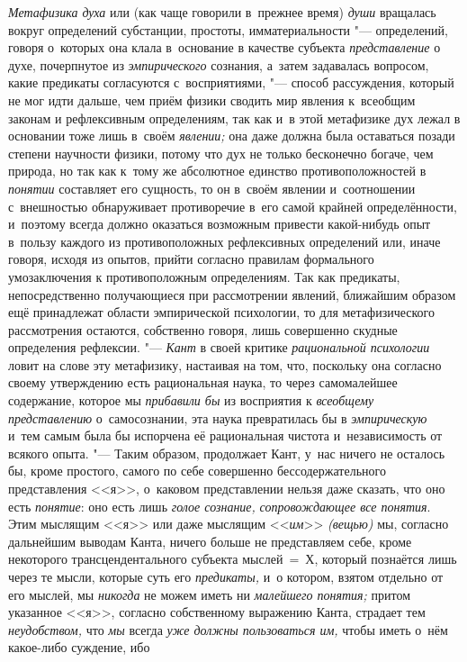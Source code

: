 {\em Метафизика духа} или (как чаще говорили в~прежнее время)
{\em души} вращалась
вокруг определений субстанции, простоты, имматериальности
"--- определений, говоря о~которых она клала в~основание в
качестве субъекта {\em представление}
о духе, почерпнутое из {\em эмпирического}
сознания, а~затем задавалась вопросом, какие предикаты
согласуются с~восприятиями, "--- способ рассуждения, который не
мог идти дальше, чем приём физики сводить мир явления к~всеобщим законам и
рефлексивным определениям, так как и~в этой метафизике дух лежал в
основании тоже лишь в~своём {\em явлении;} она даже
должна была оставаться позади степени научности физики,
потому что дух не только бесконечно богаче, чем природа, но
так как к~тому же абсолютное единство противоположностей в
{\em понятии} составляет
его сущность, то он в~своём явлении и~соотношении с~внешностью обнаруживает
противоречие в~его самой крайней определённости, и~поэтому всегда должно
оказаться возможным привести какой-нибудь опыт в~пользу каждого из
противоположных рефлексивных определений или, иначе говоря, исходя из
опытов, прийти согласно правилам формального умозаключения к
противоположным определениям. Так как предикаты, непосредственно
получающиеся при рассмотрении явлений, ближайшим образом ещё принадлежат
области эмпирической психологии, то для метафизического рассмотрения
остаются, собственно говоря, лишь совершенно скудные определения
рефлексии. "--- {\em Кант} в
своей критике {\em рациональной
психологии} ловит на слове эту метафизику, настаивая на том,
что, поскольку она согласно своему утверждению есть рациональная наука, то
через самомалейшее содержание, которое мы
{\em прибавили бы} из
восприятия к {\em всеобщему
представлению} о~самосознании, эта наука превратилась бы в
{\em эмпирическую} и~тем
самым была бы испорчена её рациональная чистота и~независимость от всякого
опыта. "--- Таким образом, продолжает Кант, у~нас ничего не
осталось бы, кроме простого, самого по себе совершенно бессодержательного
представления <<я>>, о~каковом представлении нельзя даже сказать, что оно
есть {\em понятие}: оно есть лишь {\em голое сознание,}
{\em сопровождающее все понятия}. Этим мыслящим <<я>> или даже мыслящим
<<{\em им}>> {\em (вещью)} мы, согласно
дальнейшим выводам Канта, ничего больше не представляем себе, кроме
некоторого трансцендентального субъекта мыслей~=~Х, который познаётся лишь
через те мысли, которые суть его {\em предикаты,} и~о
котором, взятом отдельно от его мыслей, мы {\em никогда} не можем
иметь ни {\em малейшего понятия;}
притом указанное <<я>>, согласно собственному выражению Канта,
страдает тем {\em неудобством,} что {\em мы} всегда {\em уже должны
пользоваться им,} чтобы иметь о~нём какое-либо суждение, ибо
